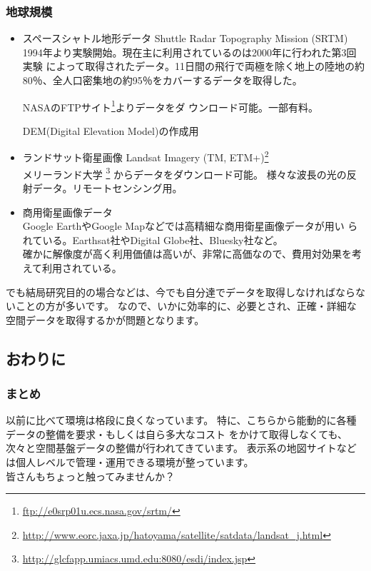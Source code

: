 \documentclass[mingoth,a4paper]{jsarticle}
\begin{document}
\subsubsection{地球規模}
\begin{itemize}
 \item スペースシャトル地形データ Shuttle Radar Topography Mission
       (SRTM)\\
       1994年より実験開始。現在主に利用されているのは2000年に行われた第3回実験
       によって取得されたデータ。11日間の飛行で両極を除く地上の陸地の約
       80％、全人口密集地の約95％をカバーするデータを取得した。

       NASAのFTPサイト\footnote{\url{ftp://e0srp01u.ecs.nasa.gov/srtm/}}よりデータをダ
       ウンロード可能。一部有料。

       DEM(Digital Elevation Model)の作成用
 \item ランドサット衛星画像 Landsat Imagery (TM,
       ETM+)\footnote{\url{http://www.eorc.jaxa.jp/hatoyama/satellite/satdata/landsat_j.html}}\\
       メリーランド大学
       \footnote{\url{http://glcfapp.umiacs.umd.edu:8080/esdi/index.jsp}}
       からデータをダウンロード可能。
       様々な波長の光の反射データ。リモートセンシング用。
 \item 商用衛星画像データ\\
       Google EarthやGoogle Mapなどでは高精細な商用衛星画像データが用い
       られている。Earthsat社やDigital Globe社、Bluesky社など。\\
       確かに解像度が高く利用価値は高いが、非常に高価なので、費用対効果を考えて利用されている。
\end{itemize}

でも結局研究目的の場合などは、今でも自分達でデータを取得しなければならないことの方が多いです。
なので、いかに効率的に、必要とされ、正確・詳細な空間データを取得するかが問題となります。

\subsection{おわりに}
\subsubsection{まとめ}
以前に比べて環境は格段に良くなっています。
特に、こちらから能動的に各種データの整備を要求・もしくは自ら多大なコスト
をかけて取得しなくても、次々と空間基盤データの整備が行われてきています。
表示系の地図サイトなどは個人レベルで管理・運用できる環境が整っています。\\
皆さんもちょっと触ってみませんか？
\end{document}

